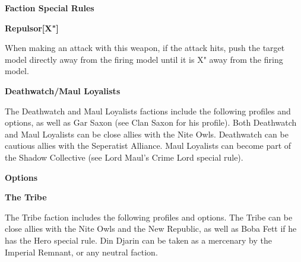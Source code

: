 \documentclass{article}
\begin{document}
{\large \textbf{Faction Special Rules}}
\vspace{0.3cm}
\begin{multicols}{2}
    {\scriptsize

    \begin{minipage}{9cm}
        {\normalsize \textbf{Repulsor[X"]}}
        \vspace{0.3cm}

        When making an attack with this weapon, if the attack hits,
        push the target model directly away from the firing model
        until it is X" away from the firing model.
    \end{minipage}

    }
\end{multicols}

\newpage

{\Large \textbf{Deathwatch/Maul Loyalists}}
\vspace{0.3cm}

\begin{minipage}{19cm}
    The Deathwatch and Maul Loyalists factions include the following profiles and
    options, as well as Gar Saxon (see Clan Saxon for his profile).
    Both Deathwatch and Maul Loyalists can be close allies with the Nite Owls.
    Deathwatch can be cautious allies with the Seperatist Alliance.
    Maul Loyalists can become part of the Shadow Collective (see Lord Maul's 
    Crime Lord special rule).
\end{minipage}

\vspace{0.3cm}
{\scriptsize
\setlength\extrarowheight{1.5pt}

}
\vspace{0.6cm}

{\large \textbf{Options}}
\vspace{0.3cm}
\begin{multicols}{2}
    {\scriptsize

    \setlength\extrarowheight{1.5pt}
    

    }
\end{multicols}
\vspace{0.6cm}

{\Large \textbf{The Tribe}}
\vspace{0.3cm}

\begin{minipage}{19cm}
    The Tribe faction includes the following profiles and options.
    The Tribe can be close allies with the Nite Owls and the New Republic, as well as
    Boba Fett if he has the Hero special rule.
    Din Djarin can be taken as a mercenary by the Imperial Remnant,
    or any neutral faction.
\end{minipage}
\end{document}
